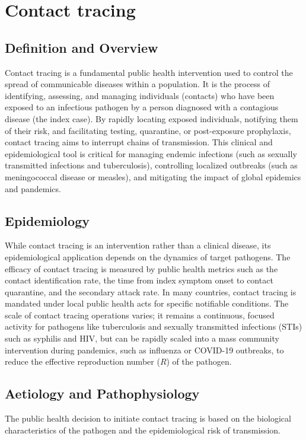 \chapter{Contact tracing}

\section*{Definition and Overview}
Contact tracing is a fundamental public health intervention used to control the spread of communicable diseases within a population. It is the process of identifying, assessing, and managing individuals (contacts) who have been exposed to an infectious pathogen by a person diagnosed with a contagious disease (the index case). By rapidly locating exposed individuals, notifying them of their risk, and facilitating testing, quarantine, or post-exposure prophylaxis, contact tracing aims to interrupt chains of transmission. This clinical and epidemiological tool is critical for managing endemic infections (such as sexually transmitted infections and tuberculosis), controlling localized outbreaks (such as meningococcal disease or measles), and mitigating the impact of global epidemics and pandemics.

\section*{Epidemiology}
While contact tracing is an intervention rather than a clinical disease, its epidemiological application depends on the dynamics of target pathogens. The efficacy of contact tracing is measured by public health metrics such as the contact identification rate, the time from index symptom onset to contact quarantine, and the secondary attack rate. In many countries, contact tracing is mandated under local public health acts for specific notifiable conditions. The scale of contact tracing operations varies; it remains a continuous, focused activity for pathogens like tuberculosis and sexually transmitted infections (STIs) such as syphilis and HIV, but can be rapidly scaled into a mass community intervention during pandemics, such as influenza or COVID-19 outbreaks, to reduce the effective reproduction number ($R$) of the pathogen.

\section*{Aetiology and Pathophysiology}
The public health decision to initiate contact tracing is based on the biological characteristics of the pathogen and the epidemiological risk of transmission.


